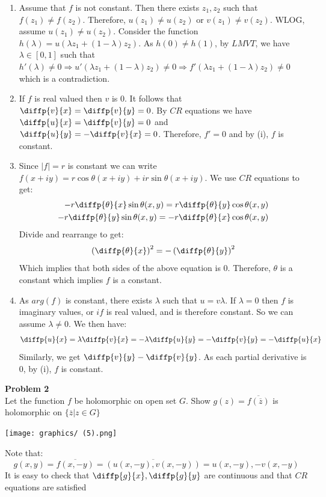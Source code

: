 \documentclass[12pt,oneside]{book}
\begin{document}
\begin{enumerate}
    \item Assume that $f$ is not constant. Then there exists $z_1,z_2$ such that $f(z_1)\ne f(z_2)$. Therefore, $u(z_1)\ne u(z_2)$ or $v(z_1)\ne v(z_2)$. WLOG, assume  $u(z_1)\ne u(z_2)$. Consider the function $h(\lambda)=u(\lambda z_1+(1-\lambda)z_2)$. As $h(0)\ne h(1)$, by $LMVT$, we have $\lambda\in [0,1]$ such that $h'(\lambda)\ne0\Rightarrow u'(\lambda z_1+(1-\lambda)z_2)\ne0\Rightarrow f'(\lambda z_1+(1-\lambda)z_2)\ne0$ which is a contradiction.
    \item If $f$ is real valued then $v$ is $0$. It follows that $\diffp{v}{x}=\diffp{v}{y}=0$. By $CR$ equations we have $\diffp{u}{x}=\diffp{v}{y}=0$ and $\diffp{u}{y}=-\diffp{v}{x}=0$. Therefore, $f'=0$ and by (i), $f$ is constant. 
    \item Since $|f|=r$ is constant we can write $f(x+iy)=r\cos\theta(x+iy)+ir\sin\theta(x+iy)$. We use $CR$ equations to get:
    \begin{align}
        -r\diffp{\theta}{x}\sin\theta(x,y)=r\diffp{\theta}{y}\cos\theta(x,y)\\
        -r\diffp{\theta}{y}\sin\theta(x,y)=-r\diffp{\theta}{x}\cos\theta(x,y)
    \end{align}
    Divide and rearrange to get:
    $$\left(\diffp{\theta}{x}\right)^2=-\left(\diffp{\theta}{y}\right)^2$$
    Which implies that both sides of the above equation is 0. Therefore, $\theta$ is a constant which implies $f$ is a constant. 
    \item As $arg(f)$ is constant, there exists $\lambda$ such that $u=v\lambda$. If $\lambda =0$ then $f$ is imaginary values, or $if$ is real valued, and is therefore constant. So we can assume $\lambda\ne0$. We then have:
    $$\diffp{u}{x}=\lambda\diffp{v}{x}=-\lambda\diffp{u}{y}=-\diffp{v}{y}=-\diffp{u}{x}$$
    Similarly, we get $\diffp{v}{y}-\diffp{v}{y}$. As each partial derivative is 0, by (i), $f$ is constant. 
\end{enumerate}


\begin{tcolorbox}[colback=blue!15]
    \textbf{Problem 2}\\
    Let the function $f$ be holomorphic on open set $G$. Show $g(z)=\overline{f(\overline{z})}$ is holomorphic on $\{\overline{z}|z\in G\}$ 
\end{tcolorbox}
\begin{marginfigure}%
    \texttt{[image: graphics/ (5).png]}
\end{marginfigure}%
Note that:
$$g(x,y)=\overline{f(x,-y)}=\overline{(u(x,-y),v(x,-y))}=u(x,-y),-v(x,-y)$$
It is easy to check that $\diffp{g}{x},\diffp{g}{y}$ are continuous and that $CR$ equations are satisfied 
\end{document}
